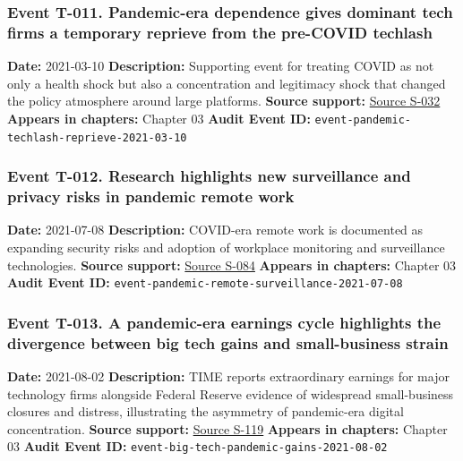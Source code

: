\documentclass[
  american,
  11pt,
  letterpaper,
]{article}
\begin{document}
\subsubsection{Event T-011. Pandemic-era dependence gives dominant tech
firms a temporary reprieve from the pre-COVID
techlash}\label{event-t-011-pandemic-era-dependence-gives-dominant-tech-firms-a-temporary-reprieve-from-the-pre-covid-techlash}

\textbf{Date:} 2021-03-10 \textbf{Description:} Supporting event for
treating COVID as not only a health shock but also a concentration and
legitimacy shock that changed the policy atmosphere around large
platforms. \textbf{Source support:}
\hyperref[source-s-032-pandemic-provides-a-techlash-reprieve]{Source
S-032} \textbf{Appears in chapters:} Chapter 03 \textbf{Audit Event ID:}
\texttt{event-pandemic-techlash-reprieve-2021-03-10}

\subsubsection{Event T-012. Research highlights new surveillance and
privacy risks in pandemic remote
work}\label{event-t-012-research-highlights-new-surveillance-and-privacy-risks-in-pandemic-remote-work}

\textbf{Date:} 2021-07-08 \textbf{Description:} COVID-era remote work is
documented as expanding security risks and adoption of workplace
monitoring and surveillance technologies. \textbf{Source support:}
\hyperref[source-s-084-remote-working-pre-and-post-covid-19-an-analysis-of-new-threats-and-risks-to-security-and-privacy]{Source
S-084} \textbf{Appears in chapters:} Chapter 03 \textbf{Audit Event ID:}
\texttt{event-pandemic-remote-surveillance-2021-07-08}

\subsubsection{Event T-013. A pandemic-era earnings cycle highlights the
divergence between big tech gains and small-business
strain}\label{event-t-013-a-pandemic-era-earnings-cycle-highlights-the-divergence-between-big-tech-gains-and-small-business-strain}

\textbf{Date:} 2021-08-02 \textbf{Description:} TIME reports
extraordinary earnings for major technology firms alongside Federal
Reserve evidence of widespread small-business closures and distress,
illustrating the asymmetry of pandemic-era digital concentration.
\textbf{Source support:}
\hyperref[source-s-119-big-tech-announces-striking-pandemic-gains-as-small-businesses-strain-to-find-their-footing]{Source
S-119} \textbf{Appears in chapters:} Chapter 03 \textbf{Audit Event ID:}
\texttt{event-big-tech-pandemic-gains-2021-08-02}
\end{document}
